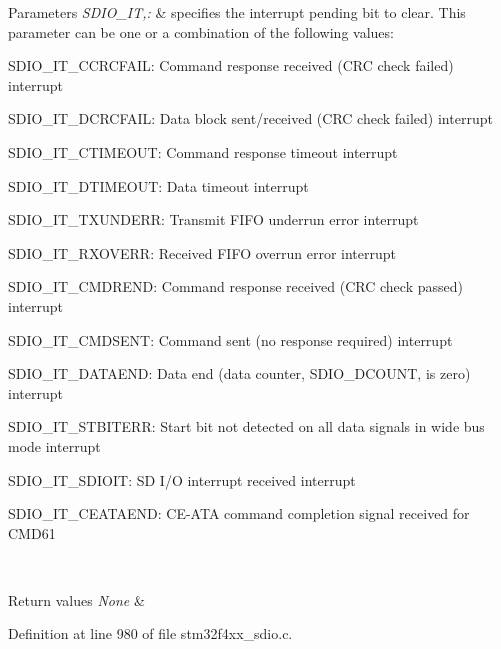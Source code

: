 \begin{DoxyParams}{Parameters}
{\em S\-D\-I\-O\-\_\-\-I\-T,\-:} & specifies the interrupt pending bit to clear. This parameter can be one or a combination of the following values\-: \begin{DoxyItemize}
\item S\-D\-I\-O\-\_\-\-I\-T\-\_\-\-C\-C\-R\-C\-F\-A\-I\-L\-: Command response received (C\-R\-C check failed) interrupt \item S\-D\-I\-O\-\_\-\-I\-T\-\_\-\-D\-C\-R\-C\-F\-A\-I\-L\-: Data block sent/received (C\-R\-C check failed) interrupt \item S\-D\-I\-O\-\_\-\-I\-T\-\_\-\-C\-T\-I\-M\-E\-O\-U\-T\-: Command response timeout interrupt \item S\-D\-I\-O\-\_\-\-I\-T\-\_\-\-D\-T\-I\-M\-E\-O\-U\-T\-: Data timeout interrupt \item S\-D\-I\-O\-\_\-\-I\-T\-\_\-\-T\-X\-U\-N\-D\-E\-R\-R\-: Transmit F\-I\-F\-O underrun error interrupt \item S\-D\-I\-O\-\_\-\-I\-T\-\_\-\-R\-X\-O\-V\-E\-R\-R\-: Received F\-I\-F\-O overrun error interrupt \item S\-D\-I\-O\-\_\-\-I\-T\-\_\-\-C\-M\-D\-R\-E\-N\-D\-: Command response received (C\-R\-C check passed) interrupt \item S\-D\-I\-O\-\_\-\-I\-T\-\_\-\-C\-M\-D\-S\-E\-N\-T\-: Command sent (no response required) interrupt \item S\-D\-I\-O\-\_\-\-I\-T\-\_\-\-D\-A\-T\-A\-E\-N\-D\-: Data end (data counter, S\-D\-I\-O\-\_\-\-D\-C\-O\-U\-N\-T, is zero) interrupt \item S\-D\-I\-O\-\_\-\-I\-T\-\_\-\-S\-T\-B\-I\-T\-E\-R\-R\-: Start bit not detected on all data signals in wide bus mode interrupt \item S\-D\-I\-O\-\_\-\-I\-T\-\_\-\-S\-D\-I\-O\-I\-T\-: S\-D I/\-O interrupt received interrupt \item S\-D\-I\-O\-\_\-\-I\-T\-\_\-\-C\-E\-A\-T\-A\-E\-N\-D\-: C\-E-\/\-A\-T\-A command completion signal received for C\-M\-D61 \end{DoxyItemize}
\\
\hline
\end{DoxyParams}

\begin{DoxyRetVals}{Return values}
{\em None} & \\
\hline
\end{DoxyRetVals}


Definition at line 980 of file stm32f4xx\-\_\-sdio.\-c.

